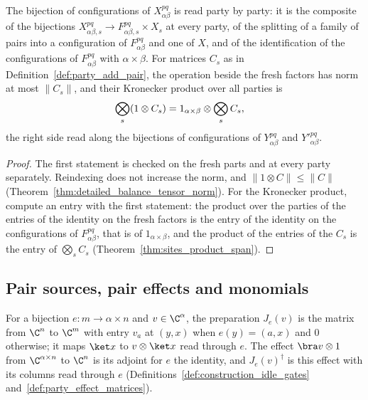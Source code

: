 \begin{theorem}
    \label{thm:party_add_pair_matrix}
    \leanok
    The bijection of configurations of $X^{pq}_{\alpha\beta}$ is read party by party:
    it is the composite of the bijections
    $X^{pq}_{\alpha\beta,s}\to F^{pq}_{\alpha\beta,s}\times X_s$ at every party, of the
    splitting of a family of pairs into a configuration of $F^{pq}_{\alpha\beta}$ and
    one of $X$, and of the identification of the configurations of
    $F^{pq}_{\alpha\beta}$ with $\alpha\times\beta$. For matrices $C_s$ as in Definition~\ref{def:party_add_pair},
    the operation beside the fresh factors has norm at most $\lVert C_s\rVert$, and
    their Kronecker product over all parties is
    \begin{align}
        \bigotimes_s(1\otimes C_s) & =1_{\alpha\times\beta}\otimes\bigotimes_sC_s, \notag
    \end{align}
    the right side read along the bijections of configurations of
    $Y^{pq}_{\alpha\beta}$ and $Y'^{pq}_{\alpha\beta}$.
\end{theorem}
\begin{proof}\leanok
    The first statement is checked on the fresh parts and at every party separately.
    Reindexing does not increase the norm, and
    $\lVert1\otimes C\rVert\le\lVert C\rVert$
    (Theorem~\ref{thm:detailed_balance_tensor_norm}). For the Kronecker product,
    compute an entry with the first statement: the product over the parties of the
    entries of the identity on the fresh factors is the entry of the identity on the
    configurations of $F^{pq}_{\alpha\beta}$, that is of $1_{\alpha\times\beta}$, and
    the product of the entries of the $C_s$ is the entry of $\bigotimes_sC_s$
    (Theorem~\ref{thm:sites_product_span}).
\end{proof}

\subsection{Pair sources, pair effects and monomials}
\label{sec:party_syntax_pair_gates}

For a bijection $e\colon m\to\alpha\times n$ and $v\in\C^\alpha$, the preparation
$J_e(v)$ is the matrix from $\C^n$ to $\C^m$ with entry $v_a$ at $(y,x)$ when
$e(y)=(a,x)$ and $0$ otherwise; it maps $\ket x$ to $v\otimes\ket x$ read through $e$.
The effect $\bra v\otimes1$ from $\C^{\alpha\times n}$ to $\C^n$ is its adjoint for
$e$ the identity, and $J_e(v)^\dagger$ is this effect with its columns read through $e$ (Definitions~\ref{def:construction_idle_gates}
and~\ref{def:party_effect_matrices}).


